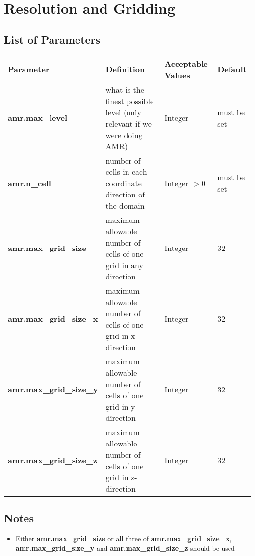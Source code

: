 \section{Resolution and Gridding}
\subsection{List of Parameters}

\begin{table*}[h]
\begin{scriptsize}
\begin{center}
\begin{tabular}{|l|l|l|l|} \hline
Parameter & Definition & Acceptable Values &Default\\
\hline
{\bf amr.max\_level}         &  what is the finest possible level (only relevant if we were doing AMR) & Integer & must be set \\
{\bf amr.n\_cell}            &  number of cells in each coordinate direction of the domain & Integer $> 0$ & must be set \\
{\bf amr.max\_grid\_size}    &  maximum allowable number of cells of one grid in any direction & Integer & 32 \\
{\bf amr.max\_grid\_size\_x} &  maximum allowable number of cells of one grid in x-direction & Integer & 32 \\
{\bf amr.max\_grid\_size\_y} &  maximum allowable number of cells of one grid in y-direction & Integer & 32 \\
{\bf amr.max\_grid\_size\_z} &  maximum allowable number of cells of one grid in z-direction & Integer & 32 \\
\hline
\end{tabular}
\label{Table:ResInputs}
\end{center}
\end{scriptsize}
\end{table*}

\subsection{Notes}

\begin{itemize}

\item Either 
{\bf amr.max\_grid\_size} or all three of 
{\bf amr.max\_grid\_size\_x}, {\bf amr.max\_grid\_size\_y} and {\bf amr.max\_grid\_size\_z}
should be used

\end{itemize}

